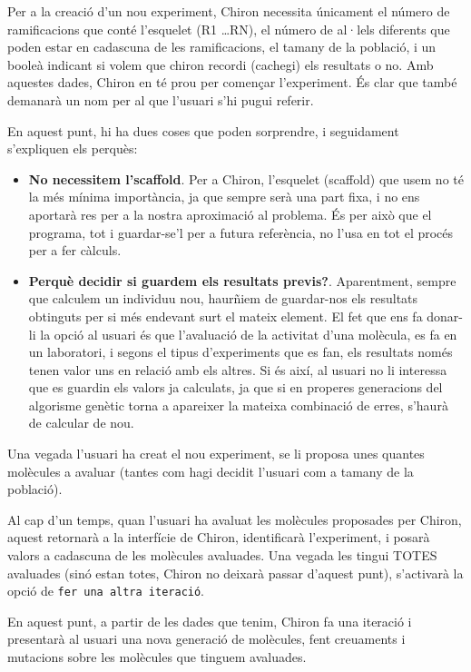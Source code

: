 \documentclass[titlepage,a4paper,12pt]{book}
\begin{document}
Per a la creació d'un nou experiment, Chiron necessita únicament el número de
ramificacions que conté l'esquelet (R1 \dots RN), el número de al·lels diferents que
poden estar en cadascuna de les ramificacions, el tamany de la població, i un booleà
indicant si volem que chiron recordi (cachegi) els resultats o no.  Amb aquestes
dades, Chiron en té prou per començar l'experiment.  És clar que també demanarà
un nom per al que l'usuari s'hi pugui referir.

En aquest punt, hi ha dues coses que poden sorprendre, i seguidament s'expliquen
els perquès:

\begin{itemize}
	\item \textbf{No necessitem l'scaffold}. Per a Chiron, l'esquelet (scaffold)
	que usem no té la més mínima importància, ja que sempre serà una part fixa,
	i no ens aportarà res per a la nostra aproximació al problema.  És per això
	que el programa, tot i guardar-se'l per a futura referència, no l'usa en tot
	el procés per a fer càlculs.

	\item \textbf{Perquè decidir si guardem els resultats previs?}.
	Aparentment, sempre que calculem un individuu nou, haurñiem de guardar-nos
	els resultats obtinguts per si més endevant surt el mateix element.  El fet
	que ens fa donar-li la opció al usuari és que l'avaluació de la activitat
	d'una molècula, es fa en un laboratori, i segons el tipus d'experiments que
	es fan, els resultats només tenen valor uns en relació amb els altres.  Si
	és així, al usuari no li interessa que es guardin els valors ja calculats,
	ja que si en properes generacions del algorisme genètic torna a apareixer la
	mateixa combinació de erres, s'haurà de calcular de nou.
\end{itemize}

Una vegada l'usuari ha creat el nou experiment, se li proposa unes quantes
molècules a avaluar (tantes com hagi decidit l'usuari com a tamany de la
població).

Al cap d'un temps, quan l'usuari ha avaluat les molècules proposades per Chiron,
aquest retornarà a la interfície de Chiron, identificarà l'experiment, i posarà
valors a cadascuna de les molècules avaluades.  Una vegada les tingui TOTES
avaluades (sinó estan totes, Chiron no deixarà passar d'aquest punt), s'activarà
la opció de \texttt{fer una altra iteració}.  

En aquest punt, a partir de les dades que tenim, Chiron fa una iteració i
presentarà al usuari una nova generació de molècules, fent creuaments i
mutacions sobre les molècules que tinguem avaluades.
\end{document}

